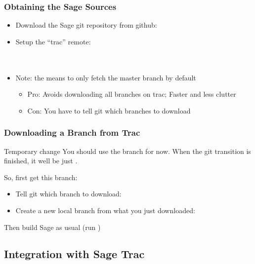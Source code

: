\begin{frame}
  \frametitle{Obtaining the Sage Sources}
  
  \begin{itemize}
  \item 
    Download the Sage git repository from github:\\
  \item 
    Setup the ``trac'' remote:\\
    {
      \\
      \\
      \hfill
    }
  \item Note: the  means to only fetch the master
    branch by default 
    \begin{itemize}
    \item Pro: Avoids downloading all branches on trac; Faster and
      less clutter
    \item Con: You have to tell git which branches to download
    \end{itemize}
  \end{itemize}
\end{frame}




\begin{frame}
  \frametitle{Downloading a Branch from Trac}

   \begin{alertblock}{Temporary change}
     You should use the  branch for
     now. When the git transition is finished, it well be just
     .
   \end{alertblock}
   
   So, first get this branch:
   \begin{itemize}
   \item 
     Tell git which branch to download:\\
   \item 
     Create a new local branch from what you just downloaded:\\
   \end{itemize}

   Then build Sage as usual (run )
\end{frame}


\subsection{Integration with Sage Trac}

